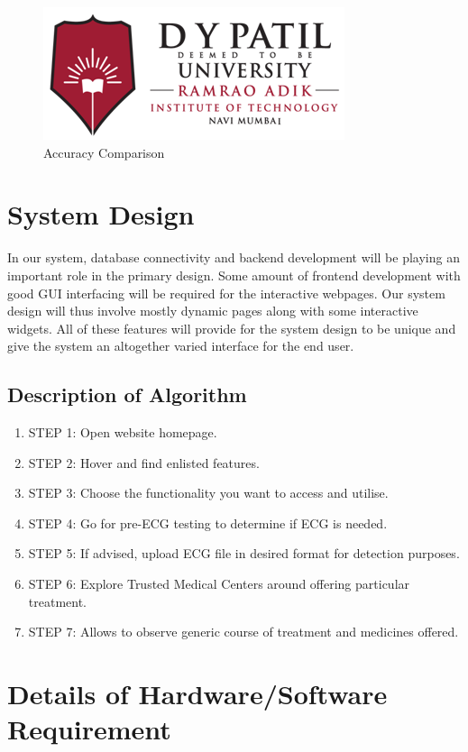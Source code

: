 \begin{figure}[h]
	\centering
	\includegraphics{rait-dypu-logo.png}
	\caption{Accuracy Comparison}
	\label{fig:acuracy-compare}
\end{figure}
\section{System Design}

In our system, database connectivity and backend development will be playing an important role in the primary design. Some amount of frontend development with good GUI interfacing will be required for the interactive webpages. Our system design will thus involve mostly dynamic pages along with some interactive widgets. All of these features will provide for the system design to be unique and give the system an altogether varied interface for the end user.  

\subsection{Description of Algorithm}
\begin{enumerate}
	\item STEP 1: Open website homepage.
	\item STEP 2: Hover and find enlisted features.
	\item STEP 3: Choose the functionality you want to access and utilise. 
	\item STEP 4: Go for pre-ECG testing to determine if ECG is needed.
	\item STEP 5:  If advised, upload ECG file in desired format for detection purposes.
	\item STEP 6:  Explore Trusted Medical Centers around offering particular treatment. 
	\item STEP 7:  Allows to observe generic course of treatment and medicines offered. 
\end{enumerate}
 
\section{Details of Hardware/Software Requirement}

